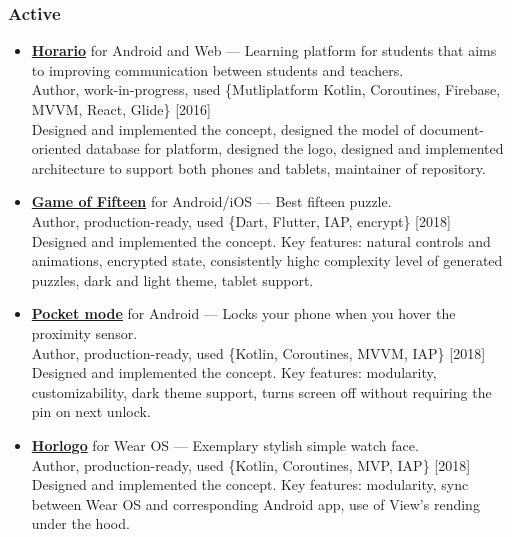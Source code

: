 \documentclass[a4paper]{article}
\begin{document}
	\subsubsection*{Active}
	\begin{itemize}
		\item \href{http://artemchep.com/horario/}{\textbf{Horario}} for Android and Web --- Learning platform for students that aims to improving communication between students and teachers. \\[0.2em]
		{\footnotesize Author, work-in-progress, used \{Mutliplatform Kotlin, Coroutines, Firebase, MVVM, React, Glide\} \hfill [2016]} \\[0.2em]
		Designed and implemented the concept, designed the model of document-oriented database for platform, designed the logo, designed and implemented architecture to support both phones and tablets, maintainer of repository.

		\item \href{https://github.com/AChep/15puzzle}{\textbf{Game of Fifteen}} for Android/iOS --- Best fifteen puzzle. \\[0.2em]
		{\footnotesize Author, production-ready, used \{Dart, Flutter, IAP, encrypt\} \hfill [2018]} \\[0.2em]
		Designed and implemented the concept. Key features: natural controls and animations, encrypted state, consistently highc complexity level of generated puzzles, dark and light theme, tablet support. 

		\item \href{https://github.com/AChep/PocketMode}{\textbf{Pocket mode}} for Android --- Locks your phone when you hover the proximity sensor. \\[0.2em]
		{\footnotesize Author, production-ready, used \{Kotlin, Coroutines, MVVM, IAP\} \hfill [2018]} \\[0.2em]
		Designed and implemented the concept. Key features: modularity, customizability, dark theme support, turns screen off without requiring the pin on next unlock.   

		\item \href{https://github.com/AChep/horlogo}{\textbf{Horlogo}} for Wear OS --- Exemplary stylish simple watch face. \\[0.2em]
		{\footnotesize Author, production-ready, used \{Kotlin, Coroutines, MVP, IAP\} \hfill [2018]} \\[0.2em]
		Designed and implemented the concept. Key features: modularity, sync between Wear OS and corresponding Android app, use of View's rending under the hood.   


\end{itemize}
\end{document}
